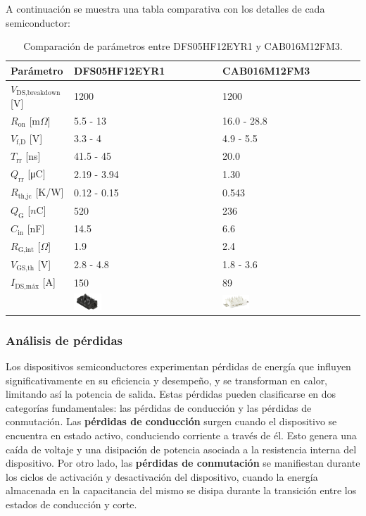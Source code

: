A continuación se muestra una tabla comparativa con los detalles de cada semiconductor:
\begin{table}[H]
	\centering
	\begin{tabular}{|l|l|l|}
		\hline
		\textbf{Parámetro} & \textbf{DFS05HF12EYR1} & \textbf{CAB016M12FM3} \\ \hline
		\(V_{\text{DS,breakdown}}\) [V] & 1200 & 1200 \\ \hline
		\(R_{\text{on}}\) [\(\text{m} \Omega\)] & 5.5 - 13 & 16.0 - 28.8 \\ \hline
		\(V_{\text{f,D}}\) [V] & 3.3 - 4 & 4.9 - 5.5 \\ \hline
		\(T_{\text{rr}}\) [ns] & 41.5 - 45 & 20.0 \\ \hline
		\(Q_{\text{rr}}\) [\unit{\micro\coulomb}] & 2.19 - 3.94 & 1.30 \\ \hline
		\(R_{\text{th,jc}}\) [K/W] & 0.12 - 0.15 & 0.543 \\ \hline
		\(Q_{\text{G}}\) [\(n\text{C}\)] & 520 & 236 \\ \hline
		\(C_{\text{in}}\) [nF] & 14.5 & 6.6 \\ \hline
		\(R_{\text{G,int}}\) [\(\Omega\)] & 1.9 & 2.4 \\ \hline
		\(V_{\text{GS,th}}\) [V] & 2.8 - 4.8 & 1.8 - 3.6 \\ \hline
		\(I_{\text{DS,máx}}\) [A] & 150 & 89 \\ \hline
		& \includegraphics[width=0.2\textwidth]{fig/DFS05.png} & \includegraphics[width=0.2\textwidth]{fig/CAB016.png} \\
		\hline
	\end{tabular}
	\caption{Comparación de parámetros entre DFS05HF12EYR1 y CAB016M12FM3.}
\end{table}

\subsubsection{Análisis de pérdidas}

Los dispositivos semiconductores experimentan pérdidas de energía que influyen significativamente en su eficiencia y desempeño, y se transforman en calor, limitando así la potencia de salida. Estas pérdidas pueden clasificarse en dos categorías fundamentales: las pérdidas de conducción y las pérdidas de conmutación. Las \textbf{pérdidas de conducción} surgen cuando el dispositivo se encuentra en estado activo, conduciendo corriente a través de él. Esto genera una caída de voltaje y una disipación de potencia asociada a la resistencia interna del dispositivo. Por otro lado, las \textbf{pérdidas de conmutación} se manifiestan durante los ciclos de activación y desactivación del dispositivo, cuando la energía almacenada en la capacitancia del mismo se disipa durante la transición entre los estados de conducción y corte.

